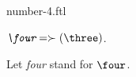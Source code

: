 \documentclass{stex}
\begin{document}
\begin{smodule}{number-4.ftl}



\begin{definition}[forthel,id=FourDef]
  $\emph{\four} = \succ(\three)$.

  Let \emph{four} stand for $\four$.
\end{definition}

\end{smodule}
\end{document}
